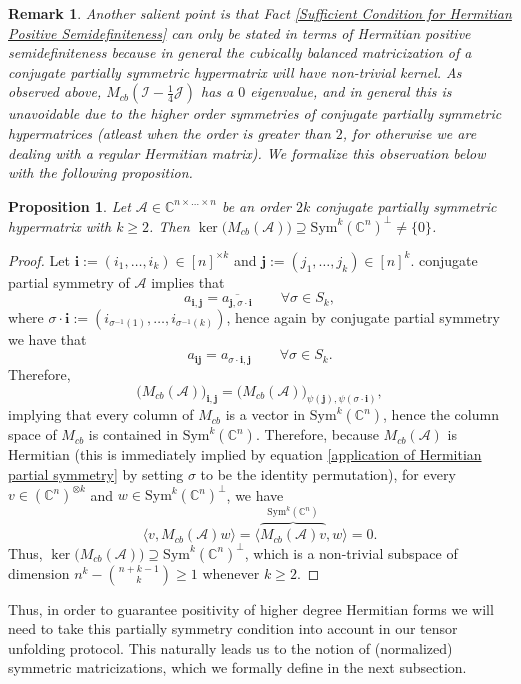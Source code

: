 \documentclass[11pt]{article}
\newtheorem{proposition}[theorem]{Proposition}
\newtheorem{remark}[theorem]{Remark}
\begin{document}
\begin{remark}
    Another salient point is that Fact \ref{Sufficient Condition for Hermitian Positive Semidefiniteness} can only be stated in terms of Hermitian positive semidefiniteness because in general the cubically balanced matricization of a conjugate partially symmetric hypermatrix will have non-trivial kernel. As observed above, $M_{cb}\left(\mathcal{I}-\frac{1}{4}\mathcal{J}\right)$ has a $0$ eigenvalue, and in general this is unavoidable due to the higher order symmetries of conjugate partially symmetric hypermatrices (atleast when the order is greater than $2$, for otherwise we are dealing with a regular Hermitian matrix). We formalize this observation below with the following proposition. 
\end{remark}
\begin{proposition}\label{Cubically Balanced Matricizations Have Non-trivial Kernel}
    Let $\mathcal{A}\in\mathbb{C}^{n\times\dots\times n}$ be an order $2k$ conjugate partially symmetric hypermatrix with $k\geq 2$. Then $\ker\big({M_{cb}(\mathcal{A})}\big)\supseteq \mathrm{Sym}^k(\mathbb{C}^n)^{\perp}\neq \{0\}$. 
\end{proposition}
\begin{proof}
    Let $\mathbf{i} := (i_1,\dots,i_k)\in [n]^{\times k}$ and $\mathbf{j} := (j_1,\dots,j_k)\in [n]^k$. conjugate partial symmetry of $\mathcal{A}$ implies that 
    \begin{equation}\label{application of Hermitian partial symmetry}
        a_{\mathbf{i},\mathbf{j}} = \overline{a_{\mathbf{j},\sigma\cdot \mathbf{i}}}\qquad \forall \sigma\in S_k,
    \end{equation}
    where $\sigma\cdot \mathbf{i} := (i_{\sigma^{-1}(1)},\dots,i_{\sigma^{-1}(k)})$, hence again by conjugate partial symmetry we have that 
    \[a_{\mathbf{i}\mathbf{j}} = a_{\sigma\cdot \mathbf{i},\mathbf{j}}\qquad \forall \sigma\in S_k.\]
    Therefore,
    \[\big(M_{cb}(\mathcal{A})\big)_{\mathbf{i},\mathbf{j}} = \big(M_{cb}(\mathcal{A})\big)_{\psi(\mathbf{j}),\psi(\sigma\cdot \mathbf{i})},\]
    implying that every column of $M_{cb}$ is a vector in $\mathrm{Sym}^k(\mathbb{C}^{n})$, hence the column space of $M_{cb}$ is contained in $\mathrm{Sym}^k(\mathbb{C}^{n})$. Therefore, because $M_{cb}(\mathcal{A})$ is Hermitian (this is immediately implied by equation \eqref{application of Hermitian partial symmetry} by setting $\sigma$ to be the identity permutation), for every $v\in (\mathbb{C}^n)^{\otimes k}$ and $w\in \mathrm{Sym}^k(\mathbb{C}^n)^{\perp}$, we have 
    \[\langle v,M_{cb}(\mathcal{A})w\rangle = \langle \overbrace{M_{cb}(\mathcal{A})v}^{\mathrm{Sym}^k(\mathbb{C}^n)},w\rangle = 0.\]
    Thus, $\ker\big(M_{cb}(\mathcal{A})\big) \supseteq \mathrm{Sym}^k(\mathbb{C}^n)^{\perp}$, which is a non-trivial subspace of dimension $n^k - \binom{n+k-1}{k} \geq 1$ whenever $k\geq 2$. 
\end{proof}
Thus, in order to guarantee positivity of higher degree Hermitian forms we will need to take this partially symmetry condition into account in our tensor unfolding protocol. This naturally leads us to the notion of (normalized) symmetric matricizations, which we formally define in the next subsection. 
\end{document}
